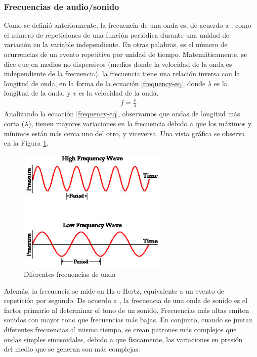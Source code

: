 \documentclass[12pt, letterpaper]{article}
\begin{document}
\subsubsection{Frecuencias de audio/sonido}
Como se definió anteriormente, la frecuencia de una onda es, de acuerdo a \cite{university-physics}, como el número de repeticiones 
    de una función periódica durante una unidad de variación en la variable independiente. En otras palabras, es el número de 
    ocurrencias de un evento repetitivo por unidad de tiempo. Matemáticamente, se dice que en medios no dispersivos (medios donde 
    la velocidad de la onda es independiente de la frecuencia), la frecuencia tiene una relación inversa con la longitud 
    de onda, en la forma de la ecuación \ref{frequency-eq}, donde $\lambda$ es la longitud de la onda, y $v$ es la velocidad de la onda.
    \begin{align}
    f = \frac{v}{\lambda}
    \label{frequency-eq}
    \end{align}Analizando la ecuación \ref{frequency-eq}, observamos que ondas de longitud más corta ($\lambda$), 
    tienen mayores variaciones en la frecuencia debido a que los máximos y mínimos están más cerca uno del otro, y viceversa. Una vista gráfica 
    se observa en la Figura \ref{frecuencias-onda}. 
    \begin{figure}[H]
      \centering
      \includegraphics[height = 6cm]{frecuencias-ondas.jpg}
      \caption{Diferentes frecuencias de onda}
      \label{frecuencias-onda}
    \end{figure}
    Además, la frecuencia se mide en Hz o Hertz, equivalente a un evento de repetición por segundo. De acuerdo a \cite{university-physics}, 
    la frecuencia de una onda de sonido es el factor primario al determinar el tono de un sonido. Frecuencias 
    más altas emiten sonidos con mayor tono que frecuencias más bajas. En conjunto, cuando se juntan diferentes frecuencias 
    al mismo tiempo, se crean patrones más complejos que ondas simples sinusoidales, debido a que físicamente, las variaciones en presión 
    del medio que se generan son más complejas. 
\end{document}
